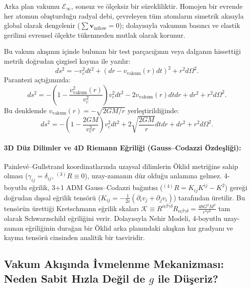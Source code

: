 Arka plan vakumu $\mathcal{E}_\infty$, sonsuz ve ölçeksiz bir sürekliliktir. Homojen bir evrende her atomun oluşturduğu radyal debi, çevreleyen tüm atomların simetrik akısıyla global olarak dengelenir ($\sum \mathbf{v}_{\mathrm{inflow}} = 0$); dolayısıyla vakumun basıncı ve elastik gerilimi evrensel ölçekte tükenmeden mutlak olarak korunur.

Bu vakum akışının içinde bulunan bir test parçacığının veya dalganın hissettiği metrik doğrudan çizgisel kayma ile yazılır:
\begin{equation}
    ds^2 = -v_c^2 dt^2 + \left( dr - v_{\mathrm{vakum}}(r) dt \right)^2 + r^2 d\Omega^2.
    \label{eq:bizim_vakum_metrigi}
\end{equation}
Parantezi açtığımızda:
\begin{equation}
    ds^2 = -\left(1 - \frac{v_{\mathrm{vakum}}^2(r)}{v_c^2}\right) v_c^2 dt^2 - 2 v_{\mathrm{vakum}}(r) dt dr + dr^2 + r^2 d\Omega^2.
    \label{eq:vakum_metrik_acik}
\end{equation}
Bu denklemde $v_{\mathrm{vakum}}(r) = -\sqrt{2GM/r}$ yerleştirildiğinde:
\begin{equation}
    ds^2 = -\left(1 - \frac{2GM}{v_c^2 r}\right) v_c^2 dt^2 + 2\sqrt{\frac{2GM}{r}} dt dr + dr^2 + r^2 d\Omega^2.
    \label{eq:bizim_yercekimi_tam}
\end{equation}

\paragraph{3D Düz Dilimler ve 4D Riemann Eğriliği (Gauss--Codazzi Özdeşliği):}
Painlevé--Gullstrand koordinatlarında uzaysal dilimlerin Öklid metriğine sahip olması ($\gamma_{ij} = \delta_{ij}$, $^{(3)}R \equiv 0$), uzay-zamanın düz olduğu anlamına gelmez. 4-boyutlu eğrilik, 3+1 ADM Gauss--Codazzi bağıntısı ($^{(4)}R = K_{ij}K^{ij} - K^2$) gereği doğrudan dışsal eğrilik tensörü ($K_{ij} = -\frac{1}{2c}(\partial_i v_j + \partial_j v_i)$) tarafından üretilir. Bu tensörün ürettiği Kretschmann eğrilik skaları $\mathcal{K} \equiv R^{\alpha\beta\gamma\delta} R_{\alpha\beta\gamma\delta} = \frac{48 G^2 M^2}{c^4 r^6}$ tam olarak Schwarzschild eğriliğini verir. Dolayısıyla Nehir Modeli, 4-boyutlu uzay-zaman eğriliğinin durağan bir Öklid arka planındaki akışkan hız gradyanı ve kayma tensörü cinsinden analitik bir tasviridir.

\subsection{Vakum Akışında İvmelenme Mekanizması: Neden Sabit Hızla Değil de \texorpdfstring{$g$}{g} ile Düşeriz?}
\label{sec:ivmelenme_ispat}

